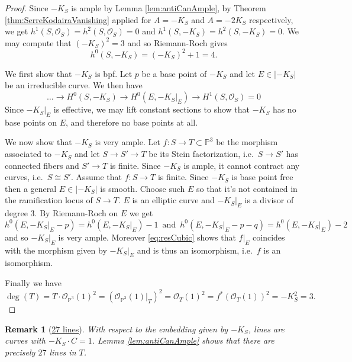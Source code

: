 \documentclass[a4paper,11pt]{amsart}
\newtheorem{remark}[theorem]{Remark}
\def\deg{\operatorname{deg}}
\newcommand{\OO}{\mathcal{O}}
\newcommand{\PP}{\mathbb{P}}
\newcommand{\isom}{\cong}
\begin{document}
\begin{proof}
	Since $-K_S$ is ample by Lemma \ref{lem:antiCanAmple}, by Theorem \ref{thm:SerreKodairaVanishing} applied for $A = -K_S$ and $A = -2K_S$ respectively, we get $h^1(S,\OO_S) = h^2(S,\OO_S) = 0$ and $h^1(S,-K_S) = h^2(S,-K_S) = 0$.
	We may compute that $(-K_S)^2 = 3$ and so Riemann-Roch gives
	\[
	h^0(S,-K_S) = (-K_S)^2 + 1 = 4.
	\]
	
	We first show that $-K_S$ is bpf.
	Let $p$ be a base point of $-K_S$ and let $E \in |-K_S|$ be an irreducible curve.
	We then have
	\begin{equation}\label{eq:resCubic}\tag{res}
	\dots \to H^0(S,-K_S) \to H^0(E,-K_S|_E) \to H^1(S,\OO_S) = 0
	\end{equation}
	Since $-K_S|_E$ is effective, we may lift constant sections to show that $-K_S$ has no base points on $E$, and therefore no base points at all.
	
	We now show that $-K_S$ is very ample.
	Let $f \colon S \to T \subset \PP^3$ be the morphism associated to $-K_S$ and let $S \to S' \to T$ be its Stein factorization, i.e.\ $S \to S'$ has connected fibers and $S'\to T$ is finite.
	Since $-K_S$ is ample, it cannot contract any curves, i.e.\ $S \isom S'$.
	Assume that $f\colon S \to T$ is finite.
	Since $-K_S$ is base point free then a general $E \in |-K_S|$ is smooth.
	Choose such $E$ so that it's not contained in the ramification locus of $S \to T$.
	$E$ is an elliptic curve and $-K_S|_E$ is a divisor of degree $3$.
	By Riemann-Roch on $E$ we get
	\[
	h^0(E,-K_S|_E - p) = h^0(E,-K_S|_E) - 1 \, \text{ and } \, h^0(E,-K_S|_E - p - q) =h^0(E,-K_S|_E) - 2
	\]
	and so $-K_S|_E$ is very ample.
	Moreover \eqref{eq:resCubic} shows that $f|_E$ coincides with the morphism given by $-K_S|_E$ and is thus an isomorphism, i.e.\ $f$ is an isomorphism.
	
	Finally we have
	\[
	\deg(T) = T\cdot \OO_{\PP^3}(1)^2 = (\OO_{\PP^3}(1)|_T)^2 = \OO_{T}(1)^2 = f^*(\OO_{T}(1))^2 = -K_S^2 = 3. 
	\]
\end{proof}



\begin{remark}[{\href{https://s-zikas.github.io/site/pics/27lines.png}{27 lines}}]\label{rem:27lines}
	With respect to the embedding given by $-K_S$, lines are curves with $-K_S \cdot C = 1$.
	Lemma \ref{lem:antiCanAmple} shows that there are precisely $27$ lines in $T$.
\end{remark}
\end{document}
